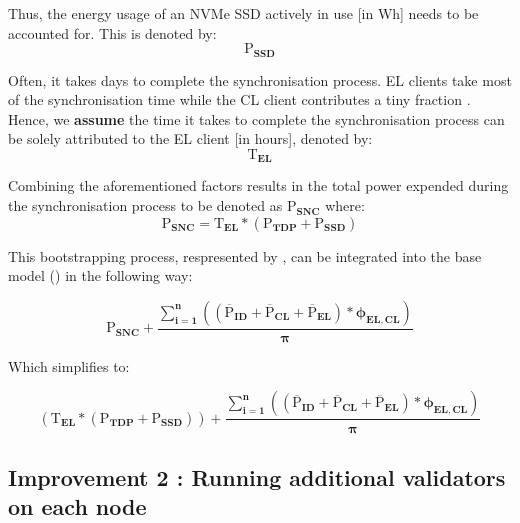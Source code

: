 Thus, the energy usage of an NVMe SSD actively in use [in Wh] needs to be accounted for. This is denoted by:
\begin{equation*}
    \boldsymbol{\mathrm{P}_{SSD} } 
\end{equation*}

Often, it takes days to complete the synchronisation process. EL clients take most of the synchronisation time while the CL client contributes a tiny fraction \cite{Ethereum/go-ethereum:Protocol}. Hence, we \textbf{assume} the time it takes to complete the synchronisation process can be solely attributed to the EL client [in hours], denoted by:
\begin{equation*}
    \boldsymbol{\mathrm{T}_{EL}}
\end{equation*}

Combining the aforementioned factors results in the total power expended during the synchronisation process to be denoted as $\boldsymbol{\mathrm{P}_{SNC}}$ where:
\begin{equation}
    \boldsymbol{\mathrm{P}_{SNC} = \mathrm{T}_{EL} * \left({\mathrm{P}_{TDP}} + \mathrm{P}_{SSD}\right)} \label{eqn:Sync}
\end{equation}

 This bootstrapping process, respresented by , can be integrated into the base model () in the following way:

\begin{equation*}
    \boldsymbol{\mathrm{P}_{SNC} +  {\frac{\displaystyle\sum\limits_{i=1}^{n}{ \left({\left(\mathrm{\overline{P}}_{ID} + \mathrm{\overline{P}}_{CL} + \mathrm{\overline{P}}_{EL}\right)} * {\phi_{EL,CL}} \right)}}
 {\pi}} } 
\end{equation*}

Which simplifies to:

\begin{equation}
     \boldsymbol{\left({\mathrm{T}_{EL} * \left({\mathrm{P}_{TDP}} + \mathrm{P}_{SSD}\right)}\right) +  {\frac{\displaystyle\sum\limits_{i=1}^{n}{ \left({\left(\mathrm{\overline{P}}_{ID} + \mathrm{\overline{P}}_{CL} + \mathrm{\overline{P}}_{EL}\right)} * {\phi_{EL,CL}} \right)}}
{\pi}} } \label{eqn:CCRISync}
\end{equation}
\label{AdditonalNodesReasoning}
\newline \newline
\subsection{ Improvement 2 : Running additional validators on each node}


